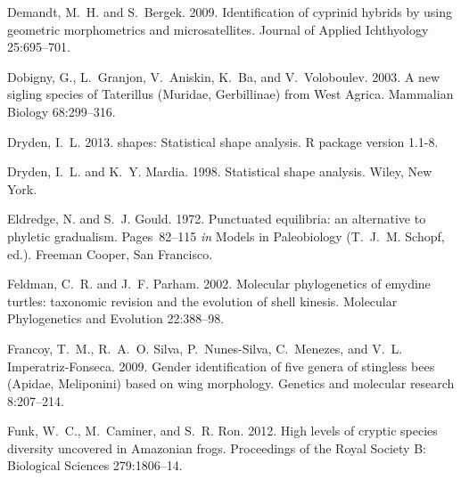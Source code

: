 \documentclass[12pt,letterpaper]{article}
\begin{document}
\begin{thebibliography}{77}
        Demandt, M.~H. and S.~Bergek. 2009. {Identification of cyprinid hybrids by
        using geometric morphometrics and microsatellites}. Journal of Applied
        Ichthyology 25:695--701.

        Dobigny, G., L.~Granjon, V.~Aniskin, K.~Ba, and V.~Voloboulev. 2003. {A new
        sigling species of Taterillus (Muridae, Gerbillinae) from West Agrica}.
        Mammalian Biology 68:299--316.

        Dryden, I.~L. 2013. shapes: Statistical shape analysis. R package version
        1.1-8.

        Dryden, I.~L. and K.~Y. Mardia. 1998. {Statistical shape analysis}. Wiley, New
        York.

        Eldredge, N. and S.~J. Gould. 1972. {Punctuated equilibria: an alternative to
        phyletic gradualism}. Pages~82--115 \emph{in} Models in Paleobiology
        (T.~J.~M. Schopf, ed.). Freeman Cooper, San Francisco.

        Feldman, C.~R. and J.~F. Parham. 2002. {Molecular phylogenetics of emydine
        turtles: taxonomic revision and the evolution of shell kinesis.} Molecular
        Phylogenetics and Evolution 22:388--98.

        Francoy, T.~M., R.~A.~O. Silva, P.~Nunes-Silva, C.~Menezes, and V.~L.
        Imperatriz-Fonseca. 2009. {Gender identification of five genera of stingless
        bees (Apidae, Meliponini) based on wing morphology}. Genetics and molecular
        research 8:207--214.

        Funk, W.~C., M.~Caminer, and S.~R. Ron. 2012. {High levels of cryptic species
        diversity uncovered in Amazonian frogs.} Proceedings of the Royal Society B:
        Biological Sciences 279:1806--14.


\end{thebibliography}
\end{document}
